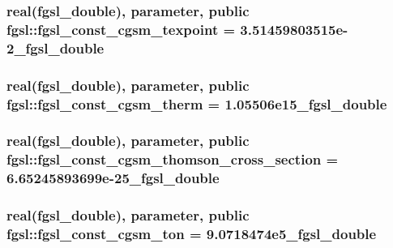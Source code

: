 \subsubsection[{fgsl\+\_\+const\+\_\+cgsm\+\_\+texpoint}]{\setlength{\rightskip}{0pt plus 5cm}real({\bf fgsl\+\_\+double}), parameter, public fgsl\+::fgsl\+\_\+const\+\_\+cgsm\+\_\+texpoint = 3.\+51459803515e-\/2\+\_\+fgsl\+\_\+double}\label{namespacefgsl_af0bb6a664a268b6db97ed93021e98828}
\hypertarget{namespacefgsl_a3a73d93cd550287bba936f1fe898b44b}{}
\subsubsection[{fgsl\+\_\+const\+\_\+cgsm\+\_\+therm}]{\setlength{\rightskip}{0pt plus 5cm}real({\bf fgsl\+\_\+double}), parameter, public fgsl\+::fgsl\+\_\+const\+\_\+cgsm\+\_\+therm = 1.\+05506e15\+\_\+fgsl\+\_\+double}\label{namespacefgsl_a3a73d93cd550287bba936f1fe898b44b}
\hypertarget{namespacefgsl_a1581b093a3a9c09cff62c4bee45c1dcd}{}
\subsubsection[{fgsl\+\_\+const\+\_\+cgsm\+\_\+thomson\+\_\+cross\+\_\+section}]{\setlength{\rightskip}{0pt plus 5cm}real({\bf fgsl\+\_\+double}), parameter, public fgsl\+::fgsl\+\_\+const\+\_\+cgsm\+\_\+thomson\+\_\+cross\+\_\+section = 6.\+65245893699e-\/25\+\_\+fgsl\+\_\+double}\label{namespacefgsl_a1581b093a3a9c09cff62c4bee45c1dcd}
\hypertarget{namespacefgsl_a4f163ec06fee37b45bf96990c803601e}{}
\subsubsection[{fgsl\+\_\+const\+\_\+cgsm\+\_\+ton}]{\setlength{\rightskip}{0pt plus 5cm}real({\bf fgsl\+\_\+double}), parameter, public fgsl\+::fgsl\+\_\+const\+\_\+cgsm\+\_\+ton = 9.\+0718474e5\+\_\+fgsl\+\_\+double}\label{namespacefgsl_a4f163ec06fee37b45bf96990c803601e}
\hypertarget{namespacefgsl_a94ff1d0989beeed6065313b2a63530cb}{}
